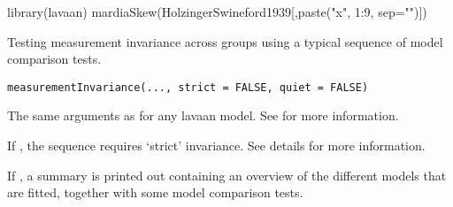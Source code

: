 \documentclass[a4paper]{book}
\begin{document}
%
\begin{Examples}
\begin{ExampleCode}
library(lavaan)
mardiaSkew(HolzingerSwineford1939[,paste("x", 1:9, sep="")])
\end{ExampleCode}
\end{Examples}
%
\begin{Description}\relax
Testing measurement invariance across groups using a typical sequence of
model comparison tests.
\end{Description}
%
\begin{Usage}
\begin{verbatim}
measurementInvariance(..., strict = FALSE, quiet = FALSE)
\end{verbatim}
\end{Usage}
%
\begin{Arguments}
\begin{ldescription}
\item[\code{...}] The same arguments as for any lavaan model.
See  for more information.
\item[\code{strict}] If , the sequence requires `strict' invariance.
See details for more information.
\item[\code{quiet}] If , a summary is printed out containing an
overview of the different models that are fitted, together with some
model comparison tests.
\end{ldescription}
\end{Arguments}
%
\end{document}
